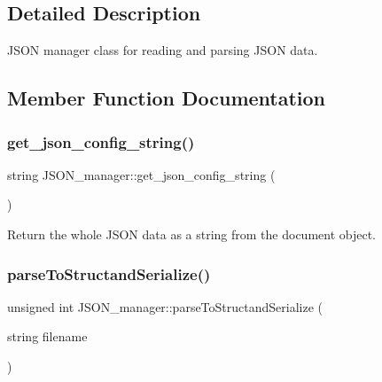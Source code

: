\subsection{Detailed Description}
J\+S\+ON manager class for reading and parsing J\+S\+ON data. 

\subsection{Member Function Documentation}
\mbox{\label{classJSON__manager_a5d05e5f8eb6883f38181d48cf26cc5fc}} 
\subsubsection{\texorpdfstring{get\+\_\+json\+\_\+config\+\_\+string()}{get\_json\_config\_string()}}
{\footnotesize\ttfamily string J\+S\+O\+N\+\_\+manager\+::get\+\_\+json\+\_\+config\+\_\+string (\begin{DoxyParamCaption}{ }\end{DoxyParamCaption})}



Return the whole J\+S\+ON data as a string from the document object. 

\mbox{\label{classJSON__manager_a7bb6db218d195494ca939233671cb183}} 
\subsubsection{\texorpdfstring{parse\+To\+Structand\+Serialize()}{parseToStructandSerialize()}}
{\footnotesize\ttfamily unsigned int J\+S\+O\+N\+\_\+manager\+::parse\+To\+Structand\+Serialize (\begin{DoxyParamCaption}\item[{string}]{filename }\end{DoxyParamCaption})}



